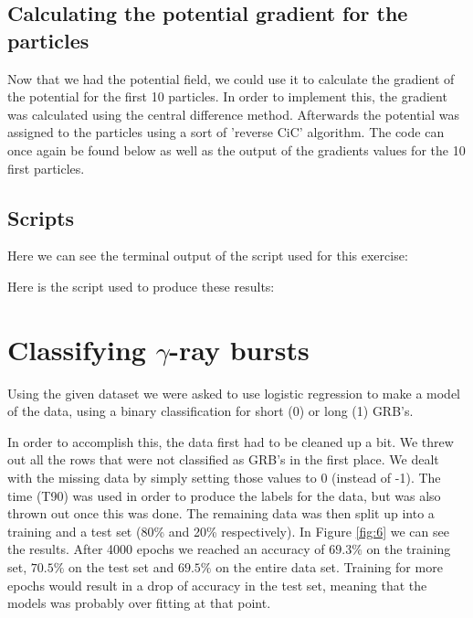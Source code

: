 \documentclass[a4paper,10pt]{article}
\begin{document}
\subsection{Calculating the potential gradient for the particles}

Now that we had the potential field, we could use it to calculate the gradient of the potential for the first 10 particles. In order to implement this, the gradient was calculated using the central difference method. Afterwards the potential was assigned to the particles using a sort of 'reverse CiC' algorithm. The code can once again be found below as well as the output of the gradients values for the 10 first particles. 

\subsection{Scripts}

Here we can see the terminal output of the script used for this exercise:


Here is the script used to produce these results: 


\section{Classifying $\gamma$-ray bursts}

Using the given dataset we were asked to use logistic regression to make a model of the data, using a binary classification for short (0) or long (1) GRB's. 

In order to accomplish this, the data first had to be cleaned up a bit. We threw out all the rows that were not classified as GRB's in the first place. We dealt with the missing data by simply setting those values to 0 (instead of -1). The time (T90) was used in order to produce the labels for the data, but was also thrown out once this was done. The remaining data was then split up into a training and a test set (80\% and 20\% respectively). In Figure \ref{fig:6} we can see the results. After 4000 epochs we reached an accuracy of $69.3\%$ on the training set, $70.5\%$ on the test set and $69.5\%$ on the entire data set. Training for more epochs would result in a drop of accuracy in the test set, meaning that the models was probably over fitting at that point.  
\end{document}
